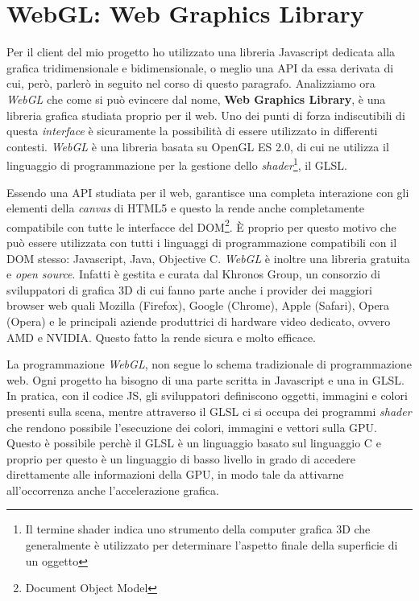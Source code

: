 \section{WebGL: Web Graphics Library}
Per il client del mio progetto ho utilizzato una libreria Javascript dedicata alla grafica tridimensionale e bidimensionale, o meglio una API da essa derivata di cui, però, parlerò in seguito nel corso di questo paragrafo. Analizziamo ora \textit{WebGL} che come si può evincere dal nome, \textbf{Web Graphics Library}, è una libreria grafica studiata proprio per il web. Uno dei punti di forza indiscutibili di questa \textit{interface} è sicuramente la possibilità di essere utilizzato in differenti contesti. \textit{WebGL} è una libreria basata su OpenGL ES 2.0\cite{ogl:def}, di cui ne utilizza il linguaggio di programmazione per la gestione dello \textit{shader}\footnote{Il termine shader indica uno strumento della computer grafica 3D che generalmente è utilizzato per determinare l'aspetto finale della superficie di un oggetto}, il GLSL. 

Essendo una API studiata per il web, garantisce una completa interazione con gli elementi della \textit{canvas} di HTML5 e questo la rende anche completamente compatibile con tutte le interfacce del DOM\footnote{Document Object Model\cite{dom:def}}. È proprio per questo motivo che può essere utilizzata con tutti i linguaggi di programmazione compatibili con il DOM stesso: Javascript, Java, Objective C. \textit{WebGL} è inoltre una libreria gratuita e \textit{open source}. Infatti è gestita e curata dal Khronos Group, un consorzio di sviluppatori di grafica 3D di cui fanno parte anche i provider dei maggiori browser web quali Mozilla (Firefox), Google (Chrome), Apple (Safari), Opera (Opera) e le principali aziende produttrici di hardware video dedicato, ovvero AMD e NVIDIA. Questo fatto la rende sicura e molto efficace.

La programmazione \textit{WebGL}, non segue lo schema tradizionale di programmazione web. Ogni progetto ha bisogno di una parte scritta in Javascript e una in GLSL. In pratica, con il codice JS, gli sviluppatori definiscono oggetti, immagini e colori presenti sulla scena, mentre attraverso il GLSL ci si occupa dei programmi \textit{shader} che rendono possibile l'esecuzione dei colori, immagini e vettori sulla GPU. Questo è possibile perchè il GLSL è un linguaggio basato sul linguaggio C e proprio per questo è un linguaggio di basso livello in grado di accedere direttamente alle informazioni della GPU, in modo tale da attivarne all'occorrenza anche l'accelerazione grafica.

